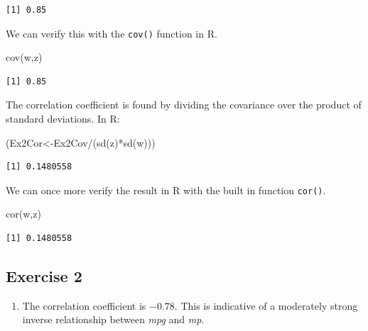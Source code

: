 \documentclass[
  letterpaper,
  DIV=11,
  numbers=noendperiod]{scrreprt}
\newenvironment{Shaded}{\begin{snugshade}}{\end{snugshade}}
\newcommand{\FunctionTok}[1]{\textcolor[rgb]{0.28,0.35,0.67}{#1}}
\newcommand{\NormalTok}[1]{\textcolor[rgb]{0.00,0.23,0.31}{#1}}
\newcommand{\OtherTok}[1]{\textcolor[rgb]{0.00,0.23,0.31}{#1}}
\newcommand{\SpecialCharTok}[1]{\textcolor[rgb]{0.37,0.37,0.37}{#1}}
\providecommand{\tightlist}{%
  \setlength{\itemsep}{0pt}\setlength{\parskip}{0pt}}\usepackage{longtable,booktabs,array}
\begin{document}
\begin{verbatim}
[1] 0.85
\end{verbatim}

We can verify this with the \texttt{cov()} function in R.

\begin{Shaded}
\begin{Highlighting}[numbers=left,,]
\FunctionTok{cov}\NormalTok{(w,z)}
\end{Highlighting}
\end{Shaded}

\begin{verbatim}
[1] 0.85
\end{verbatim}

The correlation coefficient is found by dividing the covariance over the
product of standard deviations. In R:

\begin{Shaded}
\begin{Highlighting}[numbers=left,,]
\NormalTok{(Ex2Cor}\OtherTok{\textless{}{-}}\NormalTok{Ex2Cov}\SpecialCharTok{/}\NormalTok{(}\FunctionTok{sd}\NormalTok{(z)}\SpecialCharTok{*}\FunctionTok{sd}\NormalTok{(w)))}
\end{Highlighting}
\end{Shaded}

\begin{verbatim}
[1] 0.1480558
\end{verbatim}

We can once more verify the result in R with the built in function
\texttt{cor()}.

\begin{Shaded}
\begin{Highlighting}[numbers=left,,]
\FunctionTok{cor}\NormalTok{(w,z)}
\end{Highlighting}
\end{Shaded}

\begin{verbatim}
[1] 0.1480558
\end{verbatim}

\hypertarget{exercise-2-11}{%
\subsection*{Exercise 2}\label{exercise-2-11}}

\begin{blackbox}

\begin{enumerate}
\def\labelenumi{\arabic{enumi}.}
\tightlist
\item
  The correlation coefficient is \(-0.78\). This is indicative of a
  moderately strong inverse relationship between \emph{mpg} and
  \emph{mp}.
\end{enumerate}

\end{blackbox}
\end{document}
